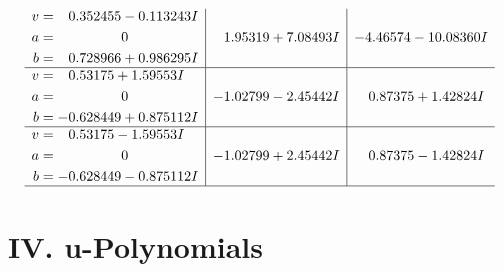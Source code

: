 \documentclass[1p]{elsarticle_modified}
\theoremstyle{definition}
\begin{document}
$$\begin{array}{c|c|c}
\begin{aligned}
v &= \phantom{-}0.352455 - 0.113243 I \\
a &= \phantom{-0.000000 } 0 \\
b &= \phantom{-}0.728966 + 0.986295 I\end{aligned}
 & \phantom{-}1.95319 + 7.08493 I & -4.46574 - 10.08360 I \\ \hline\begin{aligned}
v &= \phantom{-}0.53175 + 1.59553 I \\
a &= \phantom{-0.000000 } 0 \\
b &= -0.628449 + 0.875112 I\end{aligned}
 & -1.02799 - 2.45442 I & \phantom{-}0.87375 + 1.42824 I \\ \hline\begin{aligned}
v &= \phantom{-}0.53175 - 1.59553 I \\
a &= \phantom{-0.000000 } 0 \\
b &= -0.628449 - 0.875112 I\end{aligned}
 & -1.02799 + 2.45442 I & \phantom{-}0.87375 - 1.42824 I\\
 \hline 
 \end{array}$$\newpage
\newpage\renewcommand{\arraystretch}{1}
\centering \section*{ IV. u-Polynomials}
\end{document}
